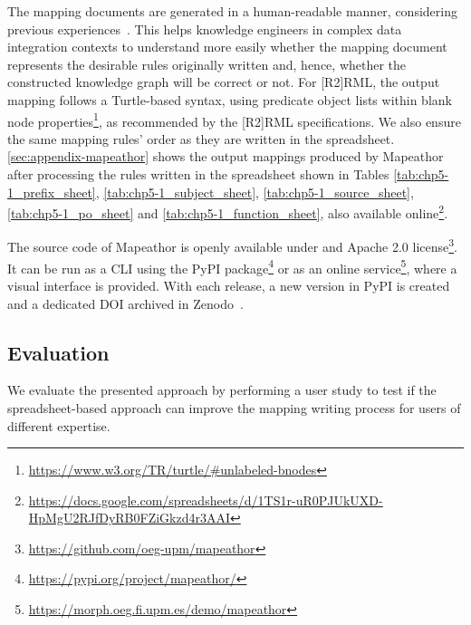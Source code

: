 The mapping documents are generated in a human-readable manner, considering previous experiences~\parencite{chaves2022systematic,corcho2021high,chaves2020bench}.
This helps knowledge engineers in complex data integration contexts to understand more easily whether the mapping document represents the desirable rules originally written and, hence, whether the constructed knowledge graph will be correct or not. 
For [R2]RML, the output mapping follows a Turtle-based syntax, using predicate object lists within blank node properties\footnote{\url{https://www.w3.org/TR/turtle/\#unlabeled-bnodes}}, as recommended by the [R2]RML specifications.
We also ensure the same mapping rules' order as they are written in the spreadsheet.
\cref{sec:appendix-mapeathor} shows the output mappings produced by Mapeathor after processing the rules written in the spreadsheet shown in Tables \ref{tab:chp5-1_prefix_sheet}, \ref{tab:chp5-1_subject_sheet}, \ref{tab:chp5-1_source_sheet}, \ref{tab:chp5-1_po_sheet} and \ref{tab:chp5-1_function_sheet}, also available online\footnote{\url{https://docs.google.com/spreadsheets/d/1TS1r-uR0PJUkUXD-HpMgU2RJfDyRB0FZiGkzd4r3AAI}}.




The source code of Mapeathor is openly available under and Apache 2.0 license\footnote{\url{https://github.com/oeg-upm/mapeathor}}. It can be run as a CLI using the PyPI package\footnote{\url{https://pypi.org/project/mapeathor/}} or as an online service\footnote{\url{https://morph.oeg.fi.upm.es/demo/mapeathor}}, where a visual interface is provided. With each release, a new version in PyPI is created and a dedicated DOI archived in Zenodo~\parencite{iglesias-molina_2023_5973906}. 




\subsection{Evaluation}
We evaluate the presented approach by performing a user study to test %
if the spreadsheet-based approach can improve the mapping writing process for users of different expertise. 

